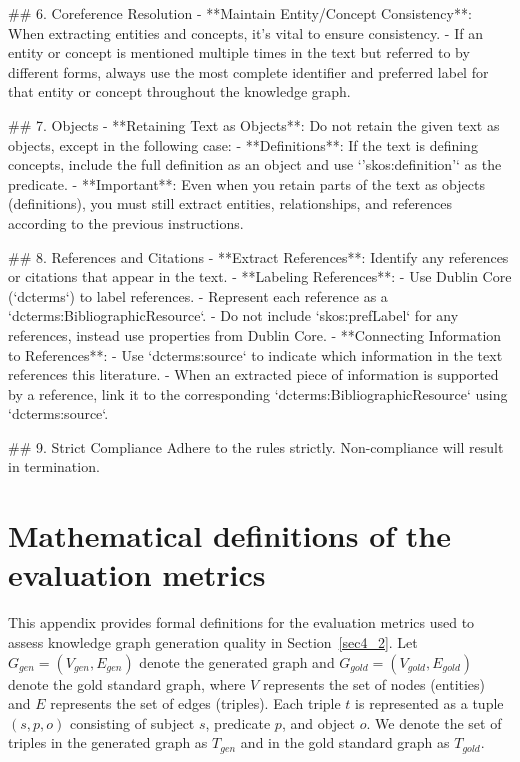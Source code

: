 \documentclass[preprint,12pt]{elsarticle}
\begin{document}
\begin{markdownprompt}
## 6. Coreference Resolution
- **Maintain Entity/Concept Consistency**: When extracting entities and concepts, it's vital to ensure consistency.
- If an entity or concept is mentioned multiple times in the text but referred to by different forms, always use the most complete identifier and preferred label for that entity or concept throughout the knowledge graph.

## 7. Objects
- **Retaining Text as Objects**: Do not retain the given text as objects, except in the following case:
  - **Definitions**: If the text is defining concepts, include the full definition as an object and use `'skos:definition'` as the predicate.
- **Important**: Even when you retain parts of the text as objects (definitions), you must still extract entities, relationships, and references according to the previous instructions.

## 8. References and Citations
- **Extract References**: Identify any references or citations that appear in the text.
- **Labeling References**:
  - Use Dublin Core (`dcterms`) to label references.
  - Represent each reference as a `dcterms:BibliographicResource`.
  - Do not include `skos:prefLabel` for any references, instead use properties from Dublin Core.
- **Connecting Information to References**:
  - Use `dcterms:source` to indicate which information in the text references this literature.
  - When an extracted piece of information is supported by a reference, link it to the corresponding `dcterms:BibliographicResource` using `dcterms:source`.

## 9. Strict Compliance
Adhere to the rules strictly. Non-compliance will result in termination.
\end{markdownprompt}

\section{Mathematical definitions of the evaluation metrics} \label{app2}
This appendix provides formal definitions for the evaluation metrics used to assess knowledge graph generation quality in Section~\ref{sec4_2}. Let $G_{gen} = (V_{gen}, E_{gen})$ denote the generated graph and $G_{gold} = (V_{gold}, E_{gold})$ denote the gold standard graph, where $V$ represents the set of nodes (entities) and $E$ represents the set of edges (triples). Each triple $t$ is represented as a tuple $(s, p, o)$ consisting of subject $s$, predicate $p$, and object $o$. We denote the set of triples in the generated graph as $T_{gen}$ and in the gold standard graph as $T_{gold}$.
\end{document}
